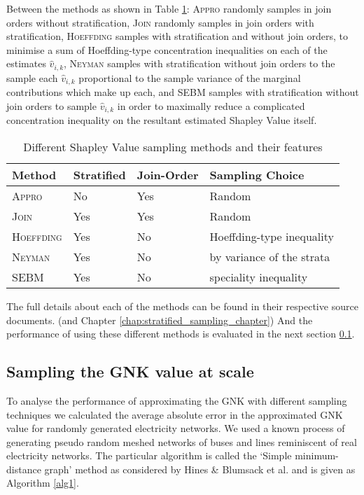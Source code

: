 Between the methods as shown in Table \ref{table:stratified_sampling_methods}: \textsc{Appro} randomly samples in join orders without stratification, \textsc{Join} randomly samples in join orders with stratification, \textsc{Hoeffding} samples with stratification and without join orders, to minimise a sum of Hoeffding-type concentration inequalities on each of the estimates $\hat{v}_{i,k}$,
\textsc{Neyman} samples with stratification without join orders to the sample each $\hat{v}_{i,k}$ proportional to the sample variance of the marginal contributions which make up each,
and \textsc{SEBM} samples with stratification without join orders to sample $\hat{v}_{i,k}$ in order to maximally reduce a complicated concentration inequality on the resultant estimated Shapley Value itself.

\begin{table}[]
\centering
\begin{tabular}{|l|l|l|l|}
\hline
Method & Stratified & Join-Order & Sampling Choice \\ \hline
\textsc{Appro} & No & Yes & Random\\
\textsc{Join} & Yes & Yes & Random\\
\textsc{Hoeffding} & Yes & No & Hoeffding-type inequality \\
\textsc{Neyman} & Yes & No & by variance of the strata \\
\textsc{SEBM} & Yes & No & speciality inequality\\ \hline
\end{tabular}
\caption{Different Shapley Value sampling methods and their features}
\label{table:stratified_sampling_methods}
\end{table}

The full details about each of the methods can be found in their respective source documents.\cite{CASTRO2017180,2013arXiv1306.4265M,DBLP:journals/cor/CastroGT09} (and Chapter \ref{chap:stratified_sampling_chapter})
And the performance of using these different methods is evaluated in the next section \ref{section:performance}.

\subsection{Sampling the GNK value at scale}\label{section:performance}

To analyse the performance of approximating the GNK with different sampling techniques we calculated the average absolute error in the approximated GNK value for randomly generated electricity networks.
We used a known process of generating pseudo random meshed networks of buses and lines reminiscent of real electricity networks. The particular algorithm is called the `Simple minimum-distance graph' method as considered by Hines \& Blumsack et al. \cite{hines1} and is given as Algorithm \ref{alg1}.

